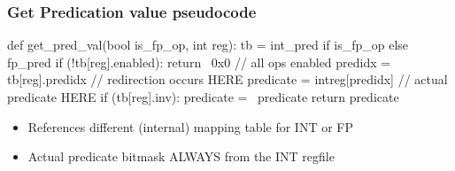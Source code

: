 \documentclass[slidestop]{beamer}
\begin{document}
\begin{frame}[fragile]
\frametitle{Get Predication value pseudocode}

\begin{semiverbatim}
def get\_pred\_val(bool is\_fp\_op, int reg):
   tb = int\_pred if is\_fp\_op else fp\_pred
   if (!tb[reg].enabled):
      return ~0x0              // all ops enabled
   predidx = tb[reg].predidx   // redirection occurs HERE
   predicate = intreg[predidx] // actual predicate HERE
   if (tb[reg].inv):
      predicate = ~predicate
   return predicate
\end{semiverbatim}

 \begin{itemize}
   \item References different (internal) mapping table for INT or FP
   \item Actual predicate bitmask ALWAYS from the INT regfile
  \end{itemize}

\end{frame}


\end{document}
